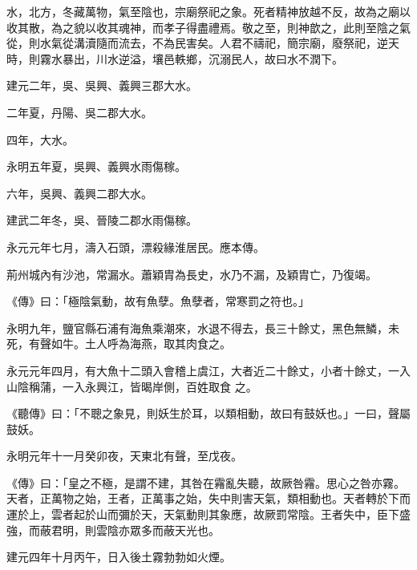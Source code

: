 \begin{pinyinscope}
 水，北方，冬藏萬物，氣至陰也，宗廟祭祀之象。死者精神放越不反，故為之廟以收其散，為之貌以收其魂神，而孝子得盡禮焉。敬之至，則神歆之，此則至陰之氣從，則水氣從溝瀆隨而流去，不為民害矣。人君不禱祀，簡宗廟，廢祭祀，逆天時，則霧水暴出，川水逆溢，壤邑軼鄉，沉溺民人，故曰水不潤下。



 建元二年，吳、吳興、義興三郡大水。



 二年夏，丹陽、吳二郡大水。



 四年，大水。



 永明五年夏，吳興、義興水雨傷稼。



 六年，吳興、義興二郡大水。



 建武二年冬，吳、晉陵二郡水雨傷稼。



 永元元年七月，濤入石頭，漂殺緣淮居民。應本傳。



 荊州城內有沙池，常漏水。蕭穎胄為長史，水乃不漏，及穎胄亡，乃復竭。



 《傳》曰：「極陰氣動，故有魚孽。魚孽者，常寒罰之符也。」



 永明九年，鹽官縣石浦有海魚乘潮來，水退不得去，長三十餘丈，黑色無鱗，未死，有聲如牛。土人呼為海燕，取其肉食之。



 永元元年四月，有大魚十二頭入會稽上虞江，大者近二十餘丈，小者十餘丈，一入山陰稱蒲，一入永興江，皆暍岸側，百姓取食
 之。



 《聽傳》曰：「不聰之象見，則妖生於耳，以類相動，故曰有鼓妖也。」一曰，聲屬鼓妖。



 永明元年十一月癸卯夜，天東北有聲，至戊夜。



 《傳》曰：「皇之不極，是謂不建，其咎在霿亂失聽，故厥咎霿。思心之咎亦霧。天者，正萬物之始，王者，正萬事之始，失中則害天氣，類相動也。天者轉於下而運於上，雲者起於山而彌於天，天氣動則其象應，故厥罰常陰。王者失中，臣下盛強，而蔽君明，則雲陰亦眾多而蔽天光也。



 建元四年十月丙午，日入後土霧勃勃如火煙。




\end{pinyinscope}
